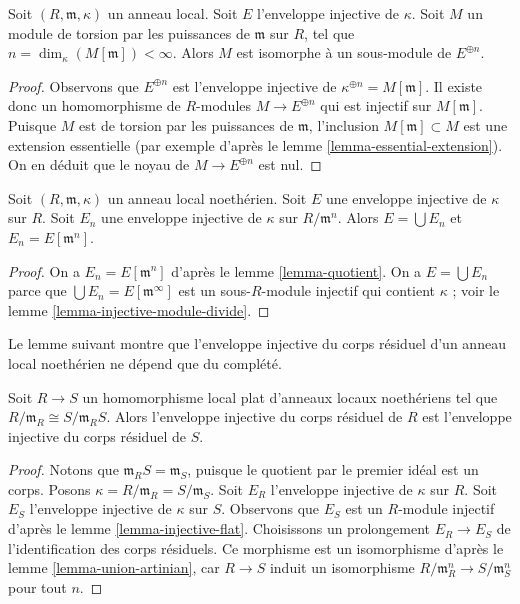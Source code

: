 \begin{lemma}
\label{lemma-torsion-submodule-sum-injective-hulls}
Soit $(R, \mathfrak m, \kappa)$ un anneau local.
Soit $E$ l'enveloppe injective de $\kappa$.
Soit $M$ un module de torsion par les puissances de $\mathfrak m$ sur $R$,
tel que $n = \dim_\kappa(M[\mathfrak m]) < \infty$.
Alors $M$ est isomorphe à un sous-module de $E^{\oplus n}$.
\end{lemma}

\begin{proof}
Observons que $E^{\oplus n}$ est l'enveloppe injective de $\kappa^{\oplus n} = M[\mathfrak m]$.
Il existe donc un homomorphisme de $R$-modules
$M \to E^{\oplus n}$ qui est injectif sur $M[\mathfrak m]$.
Puisque $M$ est de torsion par les puissances de $\mathfrak m$,
l'inclusion $M[\mathfrak m] \subset M$ est une extension essentielle
(par exemple d'après le lemme \ref{lemma-essential-extension}).
On en déduit que le noyau de $M \to E^{\oplus n}$ est nul.
\end{proof}

\begin{lemma}
\label{lemma-union-artinian}
Soit $(R, \mathfrak m, \kappa)$ un anneau local noethérien.
Soit $E$ une enveloppe injective de $\kappa$ sur $R$.
Soit $E_n$ une enveloppe injective de $\kappa$ sur $R/\mathfrak m^n$.
Alors $E = \bigcup E_n$ et $E_n = E[\mathfrak m^n]$.
\end{lemma}

\begin{proof}
On a $E_n = E[\mathfrak m^n]$ d'après le lemme \ref{lemma-quotient}.
On a $E = \bigcup E_n$ parce que $\bigcup E_n = E[\mathfrak m^\infty]$ est un sous-$R$-module injectif
qui contient $\kappa$ ; voir le lemme \ref{lemma-injective-module-divide}.
\end{proof}

\noindent
Le lemme suivant montre que l'enveloppe injective du corps résiduel
d'un anneau local noethérien ne dépend que du complété.

\begin{lemma}
\label{lemma-compare}
Soit $R \to S$ un homomorphisme local plat d'anneaux locaux noethériens
tel que $R/\mathfrak m_R \cong S/\mathfrak m_R S$.
Alors l'enveloppe injective du corps résiduel de $R$
est l'enveloppe injective du corps résiduel de $S$.
\end{lemma}

\begin{proof}
Notons que $\mathfrak m_RS = \mathfrak m_S$, puisque le quotient par le premier idéal est un corps.
Posons $\kappa = R/\mathfrak m_R = S/\mathfrak m_S$.
Soit $E_R$ l'enveloppe injective de $\kappa$ sur $R$.
Soit $E_S$ l'enveloppe injective de $\kappa$ sur $S$.
Observons que $E_S$ est un $R$-module injectif d'après le lemme \ref{lemma-injective-flat}.
Choisissons un prolongement $E_R \to E_S$ de l'identification des corps résiduels.
Ce morphisme est un isomorphisme d'après le lemme \ref{lemma-union-artinian},
car $R \to S$ induit un isomorphisme $R/\mathfrak m_R^n \to S/\mathfrak m_S^n$ pour tout $n$.
\end{proof}

